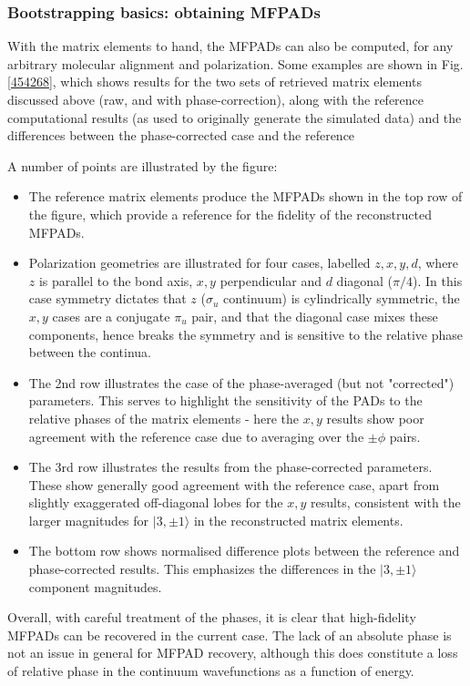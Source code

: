 \subsubsection{Bootstrapping basics: obtaining MFPADs}

With the matrix elements to hand, the MFPADs can also be computed, for any arbitrary molecular alignment and polarization. Some examples are shown in Fig. \ref{454268}, which shows results for the two sets of retrieved matrix elements discussed above (raw, and with phase-correction), along with the reference computational results (as used to originally generate the simulated data) and the differences between the phase-corrected case and the reference 

A number of points are illustrated by the figure:

\begin{itemize}
\item The reference matrix elements produce the MFPADs shown in the top row of the figure, which provide a reference for the fidelity of the reconstructed MFPADs. 
\item Polarization geometries are illustrated for four cases, labelled $z,x,y,d$, where $z$ is parallel to the bond axis, $x,y$ perpendicular and $d$ diagonal ($\pi/4$). In this case symmetry dictates that $z$ ($\sigma_u$ continuum) is cylindrically symmetric, the $x,y$ cases are a conjugate $\pi_u$ pair, and that the diagonal case mixes these components, hence breaks the symmetry and is sensitive to the relative phase between the continua.
\item The 2nd row illustrates the case of the phase-averaged (but not "corrected") parameters. This serves to highlight the sensitivity of the PADs to the relative phases of the matrix elements - here the $x,y$ results show poor agreement with the reference case due to averaging over the $\pm\phi$ pairs.
\item The 3rd row illustrates the results from the phase-corrected parameters. These show generally good agreement with the reference case, apart from slightly exaggerated off-diagonal lobes for the $x,y$ results, consistent with the larger magnitudes for $|3,\pm1\rangle$ in the reconstructed matrix elements.
\item The bottom row shows normalised difference plots between the reference and phase-corrected results. This emphasizes the differences in the $|3,\pm1\rangle$ component magnitudes.
\end{itemize}

Overall, with careful treatment of the phases, it is clear that high-fidelity MFPADs can be recovered in the current case. The lack of an absolute phase is not an issue in general for MFPAD recovery, although this does constitute a loss of relative phase in the continuum wavefunctions as a function of energy. %

